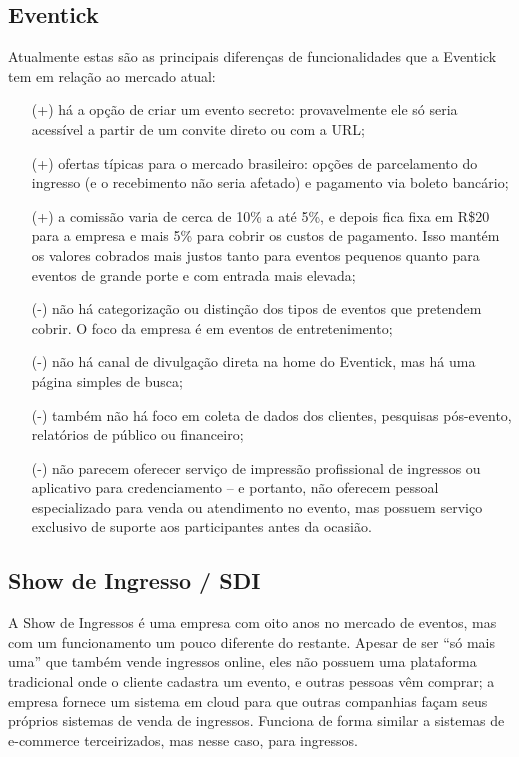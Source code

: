 \documentclass[12pt,a4paper,twoside,hyphens,english,brazil]{abntex2}
\begin{document}
\subsection{Eventick}
Atualmente estas são as principais diferenças de funcionalidades que a Eventick tem em relação ao mercado atual:
\begin{itemize}[itemsep=-0.5ex]
	\item[(+)] há a opção de criar um evento secreto: provavelmente ele só seria acessível a partir de um convite direto ou com a URL;
	\item[(+)] ofertas típicas para o mercado brasileiro: opções de parcelamento do ingresso (e o recebimento não seria afetado) e pagamento via boleto bancário;
	\item[(+)] a comissão varia de cerca de 10\% a até 5\%, e depois fica fixa em R\$20 para a empresa e mais 5\% para cobrir os custos de pagamento. Isso mantém os valores cobrados mais justos tanto para eventos pequenos quanto para eventos de grande porte e com entrada mais elevada;
	\item[(-)] não há categorização ou distinção dos tipos de eventos que pretendem cobrir. O foco da empresa é em eventos de entretenimento;
	\item[(-)] não há canal de divulgação direta na home do Eventick, mas há uma página simples de busca;
	\item[(-)] também não há foco em coleta de dados dos clientes, pesquisas pós-evento, relatórios de público ou financeiro;
	\item[(-)] não parecem oferecer serviço de impressão profissional de ingressos ou aplicativo para credenciamento -- e portanto, não oferecem pessoal especializado para venda ou atendimento no evento, mas possuem serviço exclusivo de suporte aos participantes antes da ocasião.
\end{itemize}

\subsection{Show de Ingresso / SDI}
\label{sec:show-de-ingresso}
A Show de Ingressos é uma empresa com oito anos no mercado de eventos, mas com um funcionamento um pouco diferente do restante. Apesar de ser ``só mais uma'' que também vende ingressos online, eles não possuem uma plataforma tradicional onde o cliente cadastra um evento, e outras pessoas vêm comprar; a empresa fornece um sistema em cloud para que outras companhias façam seus próprios sistemas de venda de ingressos. Funciona de forma similar a sistemas de e-commerce terceirizados, mas nesse caso, para ingressos.
\end{document}
